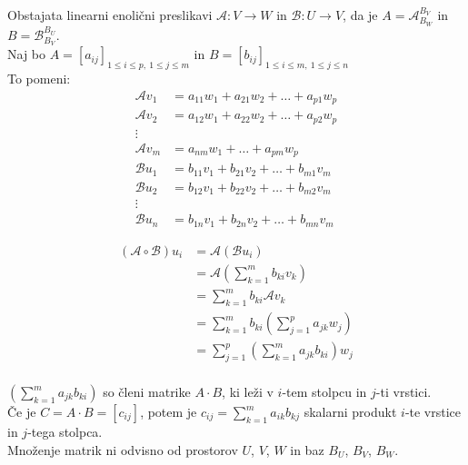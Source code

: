 \documentclass[a4paper,12pt]{article}
\begin{document}
Obstajata linearni enolični preslikavi $\mathcal{A}: V\to W$ in $\mathcal{B}:U\to V$, da je $A=\mathcal{A}_{B_W}^{B_V}$ in $B=\mathcal{B}_{B_V}^{B_U}$. \\

Naj bo $A=[a_{ij}]_{1\leq i \leq p,~1\leq j \leq m}$ in $B=[b_{ij}]_{1\leq i \leq m,~1\leq j \leq n}$ \\

To pomeni:
	\begin{align*}
		\mathcal{A}v_1 &= a_{11}w_1+a_{21}w_2+\ldots+a_{p1}w_p \\
		\mathcal{A}v_2 &= a_{12}w_1+a_{22}w_2+\ldots+a_{p2}w_p \\
		\vdots \\
		\mathcal{A}v_m &= a_{nm}w_1+\ldots+a_{pm}w_p \\
		\mathcal{B}u_1 &= b_{11}v_1+b_{21}v_2+\ldots+b_{m1}v_m \\
		\mathcal{B}u_2 &= b_{12}v_1+b_{22}v_2+\ldots+b_{m2}v_m \\
		\vdots \\
		\mathcal{B}u_n &= b_{1n}v_1+b_{2n}v_2+\ldots+b_{mn}v_m
	\end{align*}

\begin{align*}
	(\mathcal{A}\circ \mathcal{B})u_i &= \mathcal{A}(\mathcal{B} u_i) \\
	&= \mathcal{A}(\sum_{k=1}^m b_{ki}v_k) \\
	&= \sum_{k=1}^m b_{ki}\mathcal{A}v_k \\
	&= \sum_{k=1}^m b_{ki}(\sum_{j=1}^p a_{jk}w_j) \\
	&= \sum_{j=1}^p (\sum_{k=1}^m a_{jk}b_{ki})w_j \\
\end{align*}

$(\sum_{k=1}^m a_{jk}b_{ki})$ so členi matrike $A\cdot B$, ki leži v $i$-tem stolpcu in $j$-ti vrstici. \\

Če je $C=A\cdot B=[c_{ij}]$, potem je $c_{ij}=\sum_{k=1}^m a_{ik}b_{kj}$ skalarni produkt $i$-te vrstice in $j$-tega stolpca. \\

Množenje matrik ni odvisno od prostorov $U$, $V$, $W$ in baz $B_U$, $B_V$, $B_W$. \\
\end{document}
